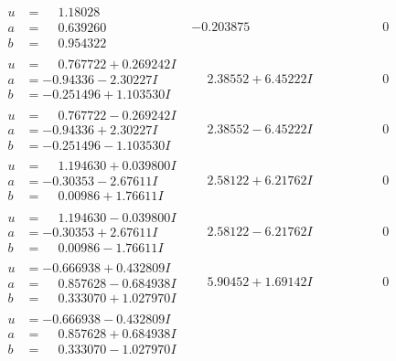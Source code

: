 \documentclass[1p]{elsarticle_modified}
\theoremstyle{definition}
\begin{document}
$$\begin{array}{c|c|c}
\begin{aligned}
u &= \phantom{-}1.18028\phantom{ +0.000000I} \\
a &= \phantom{-}0.639260\phantom{ +0.000000I} \\
b &= \phantom{-}0.954322\phantom{ +0.000000I}\end{aligned}
 & -0.203875\phantom{ +0.000000I} & \phantom{-0.000000 } 0 \\ \hline\begin{aligned}
u &= \phantom{-}0.767722 + 0.269242 I \\
a &= -0.94336 - 2.30227 I \\
b &= -0.251496 + 1.103530 I\end{aligned}
 & \phantom{-}2.38552 + 6.45222 I & \phantom{-0.000000 } 0 \\ \hline\begin{aligned}
u &= \phantom{-}0.767722 - 0.269242 I \\
a &= -0.94336 + 2.30227 I \\
b &= -0.251496 - 1.103530 I\end{aligned}
 & \phantom{-}2.38552 - 6.45222 I & \phantom{-0.000000 } 0 \\ \hline\begin{aligned}
u &= \phantom{-}1.194630 + 0.039800 I \\
a &= -0.30353 - 2.67611 I \\
b &= \phantom{-}0.00986 + 1.76611 I\end{aligned}
 & \phantom{-}2.58122 + 6.21762 I & \phantom{-0.000000 } 0 \\ \hline\begin{aligned}
u &= \phantom{-}1.194630 - 0.039800 I \\
a &= -0.30353 + 2.67611 I \\
b &= \phantom{-}0.00986 - 1.76611 I\end{aligned}
 & \phantom{-}2.58122 - 6.21762 I & \phantom{-0.000000 } 0 \\ \hline\begin{aligned}
u &= -0.666938 + 0.432809 I \\
a &= \phantom{-}0.857628 - 0.684938 I \\
b &= \phantom{-}0.333070 + 1.027970 I\end{aligned}
 & \phantom{-}5.90452 + 1.69142 I & \phantom{-0.000000 } 0 \\ \hline\begin{aligned}
u &= -0.666938 - 0.432809 I \\
a &= \phantom{-}0.857628 + 0.684938 I \\
b &= \phantom{-}0.333070 - 1.027970 I\end{aligned}

\end{array}$$
\end{document}
